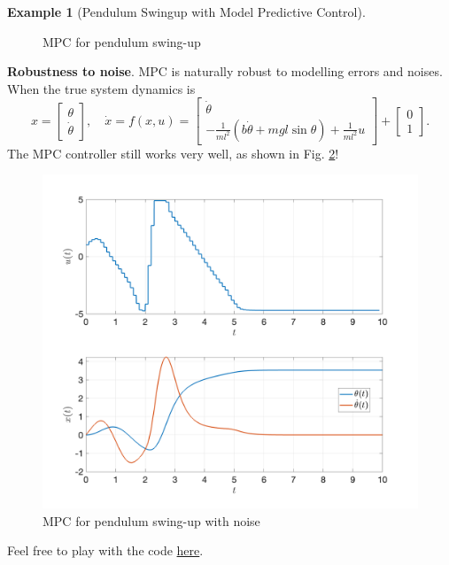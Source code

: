 \documentclass[
]{book}
\theoremstyle{definition}
\theoremstyle{definition}
\newtheorem{example}{Example}[chapter]
\theoremstyle{definition}
\theoremstyle{definition}
\theoremstyle{remark}
\begin{document}
\begin{example}[Pendulum Swingup with Model Predictive Control]
\begin{figure}
{}

\caption{MPC for pendulum swing-up}\label{fig:pendulum-swingup-mpc-noise-free}
\end{figure}

\textbf{Robustness to noise}. MPC is naturally robust to modelling errors and noises. When the true system dynamics is
\[
x = \begin{bmatrix} \theta \\ \dot{\theta} \end{bmatrix}, \quad \dot{x} = f(x,u) = \begin{bmatrix} \dot{\theta} \\ - \frac{1}{ml^2} (b \dot{\theta} + mgl \sin \theta) + \frac{1}{ml^2} u \end{bmatrix} + \begin{bmatrix} 0 \\ 1 \end{bmatrix}.
\]
The MPC controller still works very well, as shown in Fig. \ref{fig:pendulum-swingup-mpc-noise}!

\begin{figure}

{\centering \includegraphics[width=0.8\linewidth]{images/pendulum_mpc_noise} 

}

\caption{MPC for pendulum swing-up with noise}\label{fig:pendulum-swingup-mpc-noise}
\end{figure}

Feel free to play with the code \href{https://github.com/ComputationalRobotics/OptimalControlEstimation-Examples/blob/main/pendulum_mpc/pendulum_mpc.m}{here}.
\end{example}
\end{document}
